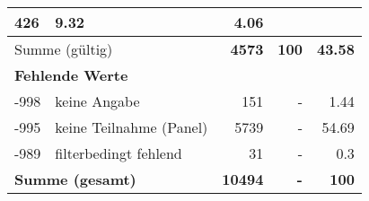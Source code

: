 \begin{longtable}{lXrrr}
       \num{426} &
       \num[round-mode=places,round-precision=2]{9.32} &
         \num[round-mode=places,round-precision=2]{4.06} \\
     \midrule
     \multicolumn{2}{l}{Summe (gültig)} &
       \textbf{\num{4573}} &
     \textbf{\num{100}} &
       \textbf{\num[round-mode=places,round-precision=2]{43.58}} \\
     \multicolumn{5}{l}{\textbf{Fehlende Werte}}\\
       -998 &
       keine Angabe &
         \num{151} &
        - &
         \num[round-mode=places,round-precision=2]{1.44} \\
       -995 &
       keine Teilnahme (Panel) &
         \num{5739} &
        - &
         \num[round-mode=places,round-precision=2]{54.69} \\
       -989 &
       filterbedingt fehlend &
         \num{31} &
        - &
         \num[round-mode=places,round-precision=2]{0.3} \\
     \midrule
     \multicolumn{2}{l}{\textbf{Summe (gesamt)}} &
          \textbf{\num{10494}} &
        \textbf{-} &
        \textbf{\num{100}} \\
     \bottomrule
     \end{longtable}
     
